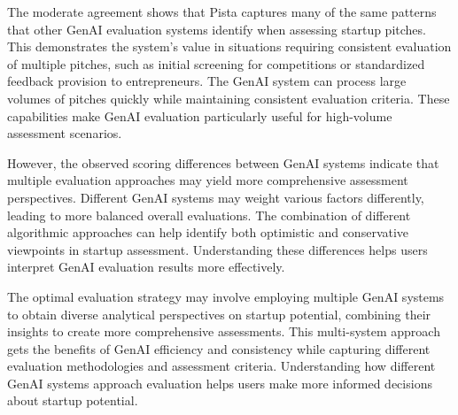The moderate agreement shows that Pista captures many of the same patterns that other GenAI evaluation systems identify when assessing startup pitches. This demonstrates the system's value in situations requiring consistent evaluation of multiple pitches, such as initial screening for competitions or standardized feedback provision to entrepreneurs. The GenAI system can process large volumes of pitches quickly while maintaining consistent evaluation criteria. These capabilities make GenAI evaluation particularly useful for high-volume assessment scenarios.

However, the observed scoring differences between GenAI systems indicate that multiple evaluation approaches may yield more comprehensive assessment perspectives. Different GenAI systems may weight various factors differently, leading to more balanced overall evaluations. The combination of different algorithmic approaches can help identify both optimistic and conservative viewpoints in startup assessment. Understanding these differences helps users interpret GenAI evaluation results more effectively.

The optimal evaluation strategy may involve employing multiple GenAI systems to obtain diverse analytical perspectives on startup potential, combining their insights to create more comprehensive assessments. This multi-system approach gets the benefits of GenAI efficiency and consistency while capturing different evaluation methodologies and assessment criteria. Understanding how different GenAI systems approach evaluation helps users make more informed decisions about startup potential.
